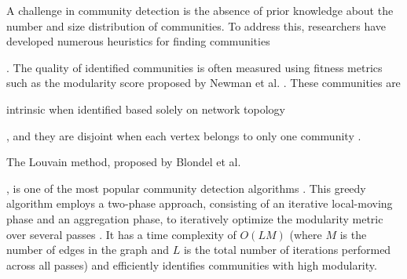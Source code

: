 A challenge in community detection is the absence of prior knowledge about the number and size distribution of communities. To address this, researchers have developed numerous heuristics for finding communities \cite{com-blondel08, com-gregory10}. The quality of identified communities is often measured using fitness metrics such as the modularity score proposed by Newman et al. \cite{com-newman04}. These communities are intrinsic when identified based solely on network topology, and they are disjoint when each vertex belongs to only one community \cite{com-gregory10}.

The Louvain method, proposed by Blondel et al. \cite{com-blondel08}, is one of the most popular community detection algorithms \cite{com-lancichinetti09}. This greedy algorithm employs a two-phase approach, consisting of an iterative local-moving phase and an aggregation phase, to iteratively optimize the modularity metric over several passes \cite{com-blondel08}. It has a time complexity of $O(LM)$ (where $M$ is the number of edges in the graph and $L$ is the total number of iterations performed across all passes) and efficiently identifies communities with high modularity.


